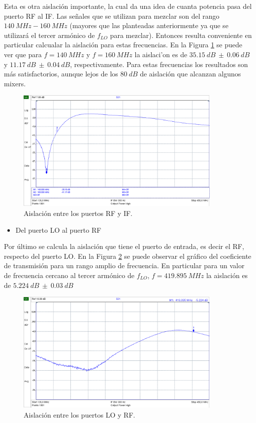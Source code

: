 \documentclass[a4paper,10pt]{article}
\begin{document}
	Esta es otra aislaci\'on importante, la cual da una idea de cuanta potencia pasa del puerto RF al IF. Las se\~nales que se utilizan para mezclar son del rango $140~MHz-160~MHz$ (mayores que las planteadas anteriormente ya que se utilizar\'a el tercer arm\'onico de $f_{LO}$ para mezclar). Entonces resulta conveniente en particular calcualar la aislaci\'on para estas frecuencias. En la Figura \ref{isolation2} se puede ver que para $f=140~MHz$ y $f=160~MHz$ la aislaci'on es de $35.15~dB~\pm~0.06~dB$ y $11.17~dB~\pm~0.04~dB$, respectivamente. Para  estas frecuencias los resultados son m\'as satisfactorios, aunque lejos de los $80~dB$ de aislaci\'on que alcanzan algunos mixers.
	
	\begin{figure}[!htb]
		\centering
		\includegraphics[width=10cm]{Images/aislacion2.png}
		\caption{Aislaci\'on entre los puertos RF y IF.}
		\label{isolation2}
	\end{figure}
	\begin{itemize}
	\item Del puerto LO al puerto RF
	\end{itemize}
	Por \'ultimo se calcula la aislaci\'on que tiene el puerto de entrada, es decir el RF, respecto del puerto LO. En la Figura \ref{isolation3} se puede observar el gr\'afico del coeficiente de transmisi\'on para un rango amplio de frecuencia. En particular para un valor de frecuencia cercano al tercer arm\'onico de $f_{LO}$, $f=419.895~MHz$ la aislaci\'on es de $5.224~dB~\pm~0.03~dB$
	
	\begin{figure}[!htb]
		\centering
		\includegraphics[width=10cm]{Images/aislacion3.png}
		\caption{Aislaci\'on entre los puertos LO y RF.}
		\label{isolation3}
	\end{figure}	
	
\end{document}
